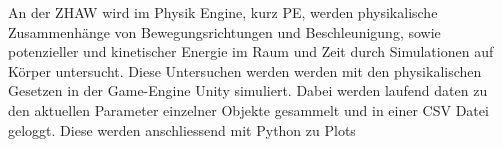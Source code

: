 \documentclass[../main.tex]{subfiles}
\begin{document}
An der ZHAW wird im Physik Engine, kurz PE, werden physikalische Zusammenhänge
von Bewegungsrichtungen und Beschleunigung, sowie potenzieller und kinetischer Energie im Raum und Zeit
durch Simulationen auf Körper untersucht.
Diese Untersuchen werden werden mit den physikalischen Gesetzen in der Game-Engine Unity simuliert.
Dabei werden laufend daten zu den aktuellen Parameter einzelner Objekte gesammelt und in einer CSV Datei
geloggt. Diese werden anschliessend mit Python zu Plots
\end{document}
